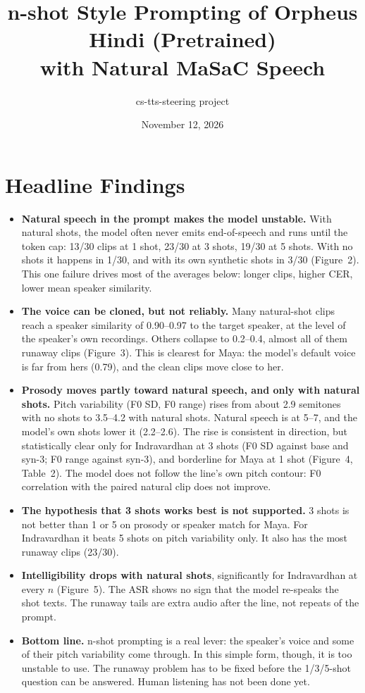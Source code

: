 \documentclass[11pt]{article}
\title{n-shot Style Prompting of Orpheus Hindi (Pretrained)\\with Natural MaSaC Speech}
\author{cs-tts-steering project}
\date{November 12, 2026}
\begin{document}
\maketitle

\section*{Headline Findings}
\begin{itemize}
\item \textbf{Natural speech in the prompt makes the model unstable.} With natural shots, the model often never emits end-of-speech and runs until the token cap: 13/30 clips at 1 shot, 23/30 at 3 shots, 19/30 at 5 shots. With no shots it happens in 1/30, and with its own synthetic shots in 3/30 (Figure~2). This one failure drives most of the averages below: longer clips, higher CER, lower mean speaker similarity.
\item \textbf{The voice can be cloned, but not reliably.} Many natural-shot clips reach a speaker similarity of 0.90--0.97 to the target speaker, at the level of the speaker's own recordings. Others collapse to 0.2--0.4, almost all of them runaway clips (Figure~3). This is clearest for Maya: the model's default voice is far from hers (0.79), and the clean clips move close to her.
\item \textbf{Prosody moves partly toward natural speech, and only with natural shots.} Pitch variability (F0 SD, F0 range) rises from about 2.9 semitones with no shots to 3.5--4.2 with natural shots. Natural speech is at 5--7, and the model's own shots lower it (2.2--2.6). The rise is consistent in direction, but statistically clear only for Indravardhan at 3 shots (F0 SD against base and syn-3; F0 range against syn-3), and borderline for Maya at 1 shot (Figure~4, Table~2). The model does not follow the line's own pitch contour: F0 correlation with the paired natural clip does not improve.
\item \textbf{The hypothesis that 3 shots works best is not supported.} 3 shots is not better than 1 or 5 on prosody or speaker match for Maya. For Indravardhan it beats 5 shots on pitch variability only. It also has the most runaway clips (23/30).
\item \textbf{Intelligibility drops with natural shots}, significantly for Indravardhan at every $n$ (Figure~5). The ASR shows no sign that the model re-speaks the shot texts. The runaway tails are extra audio after the line, not repeats of the prompt.
\item \textbf{Bottom line.} n-shot prompting is a real lever: the speaker's voice and some of their pitch variability come through. In this simple form, though, it is too unstable to use. The runaway problem has to be fixed before the 1/3/5-shot question can be answered. Human listening has not been done yet.
\end{itemize}
\end{document}
